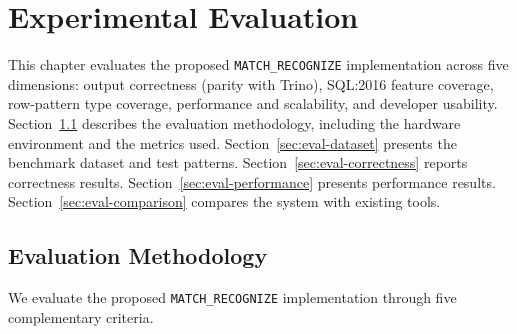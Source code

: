 \chapter{Experimental Evaluation}
\label{chap:evaluation}

This chapter evaluates the proposed \texttt{MATCH\_RECOGNIZE}
implementation across five dimensions: output correctness (parity
with Trino), SQL:2016 feature coverage, row-pattern type coverage,
performance and scalability, and developer usability.
Section~\ref{sec:eval-methodology}
describes the evaluation methodology, including the hardware
environment and the metrics used.
Section~\ref{sec:eval-dataset} presents the benchmark dataset and
test patterns.
Section~\ref{sec:eval-correctness} reports correctness results.
Section~\ref{sec:eval-performance} presents performance results.
Section~\ref{sec:eval-comparison} compares the system with existing
tools.

\section{Evaluation Methodology}
\label{sec:eval-methodology}

We evaluate the proposed \texttt{MATCH\_RECOGNIZE} implementation
through five complementary criteria.

